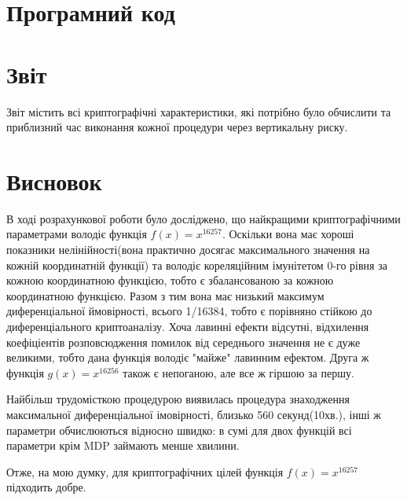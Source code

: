 \documentclass[a4paper,12pt]{article}
\begin{document}
\section*{Програмний код}

\bigskip

\bigskip

\bigskip

\bigskip

\bigskip

\section*{Звіт}
Звіт містить всі криптографічні характеристики, які потрібно було обчислити та приблизний час виконання кожної процедури через вертикальну риску. 


\section*{Висновок}
В ході розрахункової роботи було досліджено, що найкращими криптографічними параметрами володіє функція \( f(x) = x^{16257} \). Оскільки вона має хороші показники нелінійності(вона практично досягає максимального значення на кожній координатній функції) та володіє кореляційним імунітетом 0-го рівня за кожною координатною функцією, тобто є збалансованою за кожною координатною функцією. Разом з тим вона має низький максимум диференціальної ймовірності, всього 1/16384, тобто є порівняно стійкою до диференціального криптоаналізу. Хоча лавинні ефекти відсутні, відхилення коефіціентів розповсюдження помилок від середнього значення не є дуже великими, тобто дана функція володіє "майже" лавинним ефектом. Друга ж функція \( g(x) = x^{16256} \) також є непоганою, але все ж гіршою за першу. 

Найбільш трудомісткою процедурою виявилась процедура знаходження максимальної диференціальної імовірності, близько 560 секунд(10хв.), інші ж параметри  обчислюються відносно швидко: в сумі для двох функцій всі параметри крім MDP займають менше хвилини.

Отже, на мою думку, для криптографічних цілей функція \( f(x) = x^{16257} \) підходить добре.
\end{document}
